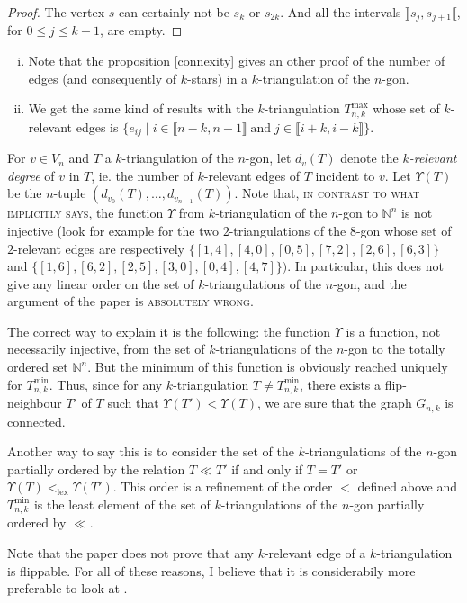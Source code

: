 \documentclass[12pt]{amsart}
\begin{document}
\begin{proof}
The vertex $s$ can certainly not be $s_k$ or $s_{2k}$. And all the intervals $\rrbracket s_j,s_{j+1}\llbracket$, for $0\le j\le k-1$, are empty.
\end{proof}


\begin{remark}
\begin{enumerate}[(i)]
\item Note that the proposition \ref{connexity} gives an other proof of the number of edges (and consequently of $k$-stars) in a $k$-triangulation of the $n$-gon.
\item We get the same kind of results with the $k$-triangulation $T_{n,k}^{\max}$ whose set of $k$-relevant edges is $\{e_{ij}\;|\;i\in\llbracket n-k,n-1\rrbracket\;\mathrm{and}\;j\in\llbracket i+k,i-k\rrbracket\}$.
\end{enumerate}
\end{remark}

\begin{bibremark}
For $v\in V_n$ and $T$ a $k$-triangulation of the $n$-gon, let $d_v(T)$ denote the \emph{$k$-relevant degree} of $v$ in $T$, ie. the number of $k$-relevant edges of $T$ incident to $v$.
Let $\Upsilon(T)$ be the $n$-tuple $(d_{v_0}(T),\ldots,d_{v_{n-1}}(T))$.
Note that, \textsc{in contrast to what \cite{dkm-lahp-02} implicitly says}, the function $\Upsilon$ from $k$-triangulation of the $n$-gon to $\mathbb{N}^n$ is not injective (look for example for the two $2$-triangulations of the $8$-gon whose set of $2$-relevant edges are respectively $\{[1,4],[4,0],[0,5],[7,2],[2,6],[6,3]\}$ and $\{[1,6],[6,2],[2,5],[3,0],[0,4],[4,7]\})$. In particular, this does not give any linear order on the set of $k$-triangulations of the $n$-gon, and the argument of the paper is \textsc{absolutely wrong}.

The correct way to explain it is the following: the function $\Upsilon$ is a function, not necessarily injective, from the set of $k$-triangulations of the $n$-gon to the totally ordered set $\mathbb{N}^n$. But the minimum of this function is obviously reached uniquely for $T_{n,k}^{\min}$. Thus, since for any $k$-triangulation $T\ne T_{n,k}^{\min}$, there exists a flip-neighbour $T'$ of $T$ such that $\Upsilon(T')<\Upsilon(T)$, we are sure that the graph $G_{n,k}$ is connected.

Another way to say this is to consider the set of the $k$-triangulations of the $n$-gon partially ordered by the relation $T\ll T'$ if and only if $T=T'$ or $\Upsilon(T)<_{\mathrm{lex}}\Upsilon(T')$. This order is a refinement of the order $<$ defined above and $T_{n,k}^{\min}$ is the least element of the set of $k$-triangulations of the $n$-gon partially ordered by $\ll$.

Note that the paper \cite{dkm-lahp-02} does not prove that any $k$-relevant edge of a $k$-triangulation is flippable. For all of these reasons, I believe that it is considerabily more preferable to look at \cite{n-gdfcp-00}.

\end{bibremark}
\end{document}
